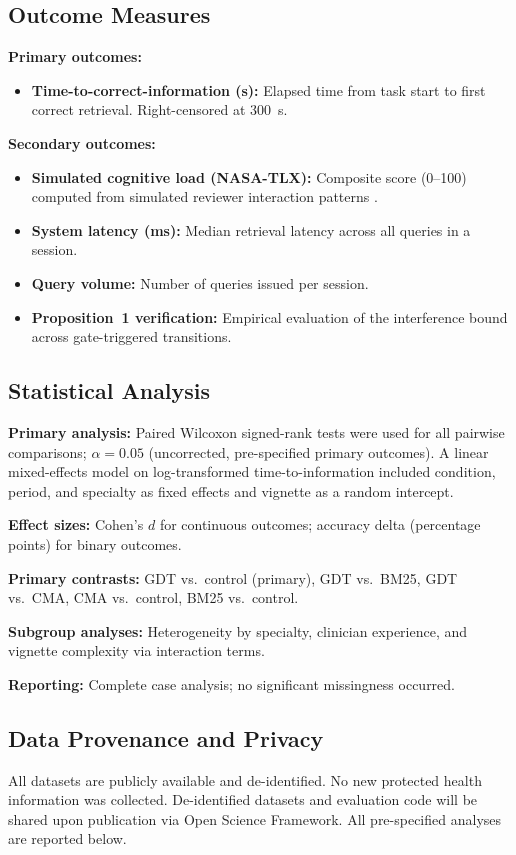 \documentclass[11pt]{article}
\begin{document}
\subsection{Outcome Measures}

\textbf{Primary outcomes:}
\begin{itemize}
  \item \textbf{Time-to-correct-information (s):} Elapsed time from task start to first correct retrieval. Right-censored at 300~s.
\end{itemize}

\textbf{Secondary outcomes:}
\begin{itemize}
  \item \textbf{Simulated cognitive load (NASA-TLX):} Composite score (0--100) computed from simulated reviewer interaction patterns \citep{hart1988}.
  \item \textbf{System latency (ms):} Median retrieval latency across all queries in a session.
  \item \textbf{Query volume:} Number of queries issued per session.
  \item \textbf{Proposition~1 verification:} Empirical evaluation of the interference bound across gate-triggered transitions.
\end{itemize}

\subsection{Statistical Analysis}

\textbf{Primary analysis:} Paired Wilcoxon signed-rank tests were used for all pairwise comparisons; $\alpha = 0.05$ (uncorrected, pre-specified primary outcomes). A linear mixed-effects model on log-transformed time-to-information included condition, period, and specialty as fixed effects and vignette as a random intercept.

\textbf{Effect sizes:} Cohen's $d$ for continuous outcomes; accuracy delta (percentage points) for binary outcomes.

\textbf{Primary contrasts:} GDT vs.\ control (primary), GDT vs.\ BM25, GDT vs.\ CMA, CMA vs.\ control, BM25 vs.\ control.

\textbf{Subgroup analyses:} Heterogeneity by specialty, clinician experience, and vignette complexity via interaction terms.

\textbf{Reporting:} Complete case analysis; no significant missingness occurred.

\subsection{Data Provenance and Privacy}
All datasets are publicly available and de-identified. No new protected health information was collected. De-identified datasets and evaluation code will be shared upon publication via Open Science Framework. All pre-specified analyses are reported below.
\end{document}
